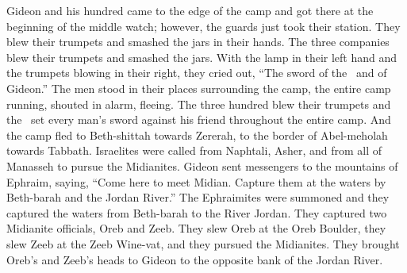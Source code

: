 \begin{inparaenum}
   Gideon and his hundred came to the edge of the camp and got there at the beginning of the middle watch; however, the guards just took their station. They blew their trumpets and smashed the jars in their hands.%
   The three companies blew their trumpets and smashed the jars. With the lamp in their left hand and the trumpets blowing in their right, they cried out, ``The sword of the \lord\ and of Gideon.''%
   The men stood in their places surrounding the camp, the entire camp running, shouted in alarm, fleeing.%
   The three hundred blew their trumpets and the \lord\ set every man's sword against his friend throughout the entire camp. And the camp fled to Beth-shittah towards Zererah, to the border of Abel-meholah towards Tabbath.%
   Israelites were called from Naphtali, Asher, and from all of Manasseh to pursue the Midianites.%
   Gideon sent messengers to the mountains of Ephraim, saying, ``Come here to meet Midian. Capture them at the waters by Beth-barah and the Jordan River.'' The Ephraimites were summoned and they captured the waters from Beth-barah to the River Jordan.%
   They captured two Midianite officials, Oreb and Zeeb. They slew Oreb at the Oreb Boulder, they slew Zeeb at the Zeeb Wine-vat, and they pursued the Midianites. They brought Oreb's and Zeeb's heads to Gideon to the opposite bank of the Jordan River.%
\end{inparaenum}
